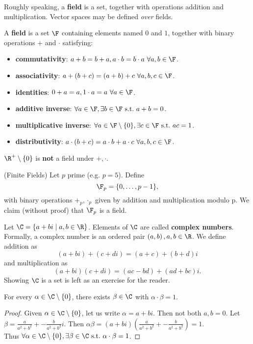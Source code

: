 \documentclass[math0540-lecture-notes.tex]{subfiles}
\begin{document}
Roughly speaking, a \textbf{field} is a set, together with operations addition and multiplication.
Vector spaces may be defined \textit{over} fields.
\begin{definition}[Fields]{}
  A \textbf{field} is a set $\F$ containing elements named $0$ and $1$, together with binary
  operations  $+$ and $\cdot $ satisfying:
  \begin{itemize}
    \item \textbf{commutativity}: $a+b=b+a, a\cdot b=b\cdot a~\forall a,b\in \F$.
    \item \textbf{associativity}: $a+(b+c)=(a+b)+c~\forall a,b,c\in \F$.
    \item \textbf{identities}: $0+a=a, 1\cdot a=a~\forall a\in \F$.
    \item \textbf{additive inverse}: $\forall a\in \F, \exists b\in \F~\text{s.t.}~a+b=0$.
    \item \textbf{multiplicative inverse}: $\forall a\in \F\setminus \{ 0 \}, \exists c\in
      \F~\text{s.t.}~ac=1$.
    \item \textbf{distributivity}: $a\cdot (b+c) = a\cdot b+a\cdot c~\forall a,b,c\in \F$.
  \end{itemize}
\end{definition}
\begin{example}
  $\R^{+}\setminus \{ 0 \}$ is \textbf{not} a field under $+,\cdot $.
\end{example}

\begin{example}
  (Finite Fields) Let $p$ prime (e.g. $p=5$). Define \[
      \F_p = \{0,\ldots,p-1\} 
  ,\] with binary operations $+_p,\cdot_p $ given by addition and multiplication modulo p. We claim
  (without proof) that $\F_p$ is a field.
\end{example}

\begin{example}
  Let $\C=\{a+bi\mid a,b\in \R\} $. Elements of $\C$ are called \textbf{complex numbers}. Formally,
  a complex number is an ordered pair $\left( a,b \right),a,b\in \R$. We define addition as \[
    (a+bi)+(c+di) = (a+c)+(b+d)i
  \] and multiplication as \[
  (a+bi)(c+di) = (ac-bd)+(ad+bc)i
  .\] 
  Showing $ \C$ is a set is left as an exercise for the reader.
\end{example}
\begin{proposition}{}
  For every $\alpha\in \C\setminus \{ 0 \}$, there exists $\beta\in \C$ with $\alpha\cdot \beta=1$.
\end{proposition}
\begin{proof}[Proof]
  Given $\alpha\in \C\setminus \{ 0 \}$, let us write $ \alpha=a+bi$. Then not both $a,b=0$. Let
  $\beta=\frac{a}{a^2+b^2}+-\frac{b}{a^2+b^2}i$. Then $\alpha\beta=(a+bi)\left( \frac{a}{a^2+b^2}
  +-\frac{b}{a^2+b^2}\right) =1$. \\
  Thus $\forall \alpha\in \C\setminus \{ 0 \}, \exists \beta\in \C ~\text{s.t.}~\alpha\cdot \beta=1$.
\end{proof}
\end{document}
